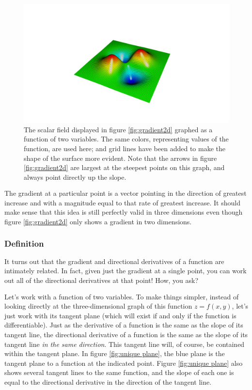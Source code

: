 \documentclass{myarticle}
\theoremstyle{nospace}
\newtheorem{old series theorem}{Theorem}
\newenvironment{series theorem}{\begin{mdframed}\begin{old series theorem}}{\end{old series theorem}\end{mdframed}}
\begin{document}
\begin{figure}[htb!] \centering

\includegraphics[width=15cm]{data/gradient3d.pdf}

\caption{The scalar field displayed in figure \ref{fig:gradient2d} graphed as a function of two variables. The same colors, representing values of the function, are used here; and grid lines have been added to make the shape of the surface more evident. Note that the arrows in figure \ref{fig:gradient2d} are largest at the steepest points on this graph, and always point directly up the slope.}
\label{fig:gradient3d}
\end{figure}

The gradient at a particular point is a vector pointing in the direction of greatest increase and with a magnitude equal to that rate of greatest increase. It should make sense that this idea is still perfectly valid in three dimensions even though figure \ref{fig:gradient2d} only shows a gradient in two dimensions.

\subsubsection{Definition} \label{sec:gradient definition}

It turns out that the gradient and directional derivatives of a function are intimately related. In fact, given just the gradient at a single point, you can work out all of the directional derivatives at that point! How, you ask?

Let's work with a function of two variables. To make things simpler, instead of looking directly at the three-dimensional graph of this function $z = f(x, y)$, let's just work with its tangent plane (which will exist if and only if the function is differentiable). Just as the derivative of a function is the same as the slope of its tangent line, the directional derivative of a function is the same as the slope of its tangent line \textit{in the same direction}. This tangent line will, of course, be contained within the tangent plane. In figure \ref{fig:unique plane}, the blue plane is the tangent plane to a function at the indicated point. Figure \ref{fig:unique plane} also shows several tangent lines to the same function, and the slope of each one is equal to the directional derivative in the direction of the tangent line.
\end{document}
